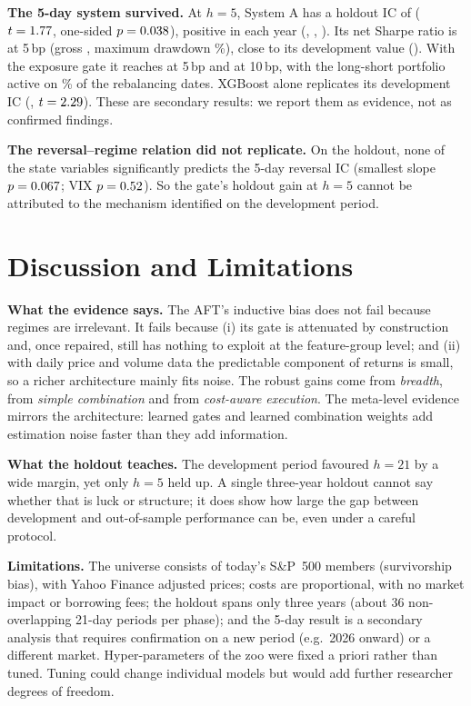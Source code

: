 \textbf{The 5-day system survived.} At $h=5$, System A has a holdout IC of \hFIc{} ($t=1.77$, one-sided $p=0.038$), positive in each year (\hFIcYa, \hFIcYb, \hFIcYc). Its net Sharpe ratio is \sysfAholdSrf{} at 5\,bp (gross \sysfAholdSrz, maximum drawdown \sysfAholdMdd\%), close to its development value (\sysfAdevSrf). With the exposure gate it reaches \sysfFullholdSrf{} at 5\,bp and \sysfFullholdSrt{} at 10\,bp, with the long-short portfolio active on \sysfFullholdExp\% of the rebalancing dates. XGBoost alone replicates its development IC (\hfXgbIc, $t=2.29$). These are secondary results: we report them as evidence, not as confirmed findings.

\textbf{The reversal--regime relation did not replicate.} On the holdout, none of the state variables significantly predicts the 5-day reversal IC (smallest slope $p=0.067$; VIX $p=0.52$). So the gate's holdout gain at $h=5$ cannot be attributed to the mechanism identified on the development period.

\section{Discussion and Limitations}
\textbf{What the evidence says.} The AFT's inductive bias does not fail because regimes are irrelevant. It fails because (i) its gate is attenuated by construction and, once repaired, still has nothing to exploit at the feature-group level; and (ii) with daily price and volume data the predictable component of returns is small, so a richer architecture mainly fits noise. The robust gains come from \emph{breadth}, from \emph{simple combination} and from \emph{cost-aware execution}. The meta-level evidence mirrors the architecture: learned gates and learned combination weights add estimation noise faster than they add information.

\textbf{What the holdout teaches.} The development period favoured $h=21$ by a wide margin, yet only $h=5$ held up. A single three-year holdout cannot say whether that is luck or structure; it does show how large the gap between development and out-of-sample performance can be, even under a careful protocol.

\textbf{Limitations.} The universe consists of today's S\&P~500 members (survivorship bias), with Yahoo Finance adjusted prices; costs are proportional, with no market impact or borrowing fees; the holdout spans only three years (about 36 non-overlapping 21-day periods per phase); and the 5-day result is a secondary analysis that requires confirmation on a new period (e.g.\ 2026 onward) or a different market. Hyper-parameters of the zoo were fixed a priori rather than tuned. Tuning could change individual models but would add further researcher degrees of freedom.

